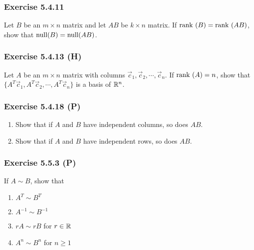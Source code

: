 \documentclass[pdf,9pt,t]{beamer}
\begin{document}
\begin{frame}[fragile]
    \frametitle{Exercise 5.4.11}
    \begin{problem}
	Let $B$ be an $m \times n$ matrix and let $AB$ be $k \times n$ matrix. If $\mbox{rank }(B) = \mbox{rank }(AB)$,
	show that $\mbox{null}(B) = \mbox{null}(AB)$.
    \end{problem}
\end{frame}
\begin{frame}[fragile]
    \frametitle{Exercise 5.4.13 (H)}
    \begin{problem}
	Let $A$ be an $m \times n$ matrix with columns $\vec{c}_1,\vec{c}_2,\cdots,\vec{c}_n$. If $\mbox{rank }(A)=n$, show that
	$\{A^T \vec{c}_1,  A^T \vec{c}_2, \cdots, A^{T} \vec{c}_n   \}$ is a basis of $\mathbb{R}^n$.
    \end{problem}

\end{frame}
\begin{frame}[fragile]
    \frametitle{Exercise 5.4.18 (P)}
    \begin{problem}
	\begin{enumerate}
	    \item Show that if $A$ and $B$ have independent columns, so does $AB$.
	    \item Show that if $A$ and $B$ have independent rows, so does $AB$.
	\end{enumerate}
    \end{problem}

\end{frame}
\begin{frame}[fragile]
    \frametitle{Exercise 5.5.3  (P)}
    \begin{problem}
	If $A\sim B$, show that
	\begin{enumerate}
	    \item $A^T\sim B^T$
	    \item $A^{-1}\sim B^{-1}$
	    \item $r A\sim rB$ for $r\in \mathbb{R}$
	    \item $A^{n}\sim B^{n}$ for $n\ge 1$
	\end{enumerate}
    \end{problem}

\end{frame}
\end{document}
